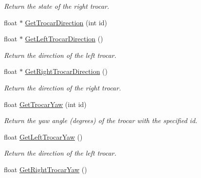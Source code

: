 \begin{DoxyCompactItemize}
\begin{DoxyCompactList}\small\item\em Return the state of the right trocar. \item\end{DoxyCompactList}\item 
float $\ast$ \hyperlink{classvtkIHP_a51ffd1fb138d362a766df8de9e5ccbdb}{GetTrocarDirection} (int id)
\item 
\hypertarget{classvtkIHP_ad0d4f0c1ac2a4579e12265b1c6c66613}{
float $\ast$ \hyperlink{classvtkIHP_ad0d4f0c1ac2a4579e12265b1c6c66613}{GetLeftTrocarDirection} ()}
\label{classvtkIHP_ad0d4f0c1ac2a4579e12265b1c6c66613}

\begin{DoxyCompactList}\small\item\em Return the direction of the left trocar. \item\end{DoxyCompactList}\item 
\hypertarget{classvtkIHP_a0d57160939eabba73f965da837e8be46}{
float $\ast$ \hyperlink{classvtkIHP_a0d57160939eabba73f965da837e8be46}{GetRightTrocarDirection} ()}
\label{classvtkIHP_a0d57160939eabba73f965da837e8be46}

\begin{DoxyCompactList}\small\item\em Return the direction of the right trocar. \item\end{DoxyCompactList}\item 
\hypertarget{classvtkIHP_a677d8fcd2bcc5f8a29826029a29d9831}{
float \hyperlink{classvtkIHP_a677d8fcd2bcc5f8a29826029a29d9831}{GetTrocarYaw} (int id)}
\label{classvtkIHP_a677d8fcd2bcc5f8a29826029a29d9831}

\begin{DoxyCompactList}\small\item\em Return the yaw angle (degrees) of the trocar with the specified id. \item\end{DoxyCompactList}\item 
\hypertarget{classvtkIHP_a0078f1a93a92ede95b5baed689cbeebb}{
float \hyperlink{classvtkIHP_a0078f1a93a92ede95b5baed689cbeebb}{GetLeftTrocarYaw} ()}
\label{classvtkIHP_a0078f1a93a92ede95b5baed689cbeebb}

\begin{DoxyCompactList}\small\item\em Return the direction of the left trocar. \item\end{DoxyCompactList}\item 
\hypertarget{classvtkIHP_aeb35510cfc98036b126b9491e67589ac}{
float \hyperlink{classvtkIHP_aeb35510cfc98036b126b9491e67589ac}{GetRightTrocarYaw} ()}
\label{classvtkIHP_aeb35510cfc98036b126b9491e67589ac}


\end{DoxyCompactItemize}
